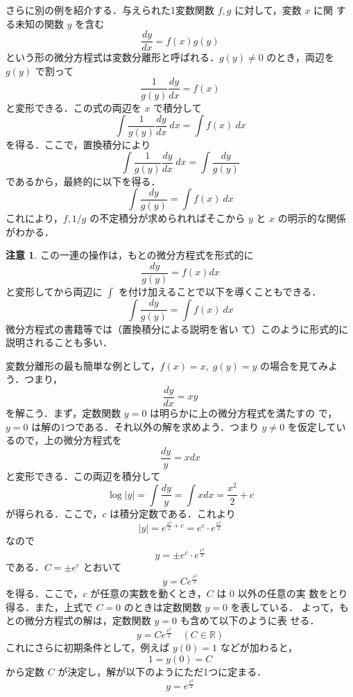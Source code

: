 \documentclass[10pt, uplatex, dvipdfmx]{jsarticle}
\theoremstyle{definition}
\newtheorem*{remark}{注意}
\numberwithin{equation}{section}
\newcommand{\ds}{\displaystyle}
\begin{document}

さらに別の例を紹介する．与えられた1変数関数 $f, g$ に対して，変数 $x$ に関
する未知の関数 $y$ を含む
\[
  \frac{dy}{dx} = f(x) g(y)
\]
という形の微分方程式は変数分離形と呼ばれる．$g(y) \neq 0$ のとき，両辺を $g(y)$ で割って
\[
  \frac{1}{g(y)}\frac{dy}{dx} = f(x)
\]
と変形できる．この式の両辺を $x$ で積分して
\[
  \int \frac{1}{g(y)} \frac{dy}{dx} \ dx = \int f(x) \ dx
\]
を得る．ここで，置換積分により
\[
  \int \frac{1}{g(y)} \frac{dy}{dx} \ dx = \int \frac{dy}{g(y)}
\]
であるから，最終的に以下を得る．
\[
  \int \frac{dy}{g(y)} = \int f(x) \ dx
\]
これにより，$f, 1/g$ の不定積分が求められればそこから $y$ と $x$ の明示的な関係がわかる．

\begin{remark}
  この一連の操作は，もとの微分方程式を形式的に
  \[
    \frac{dy}{g(y)} = f(x) dx
  \]
  と変形してから両辺に $\ds \int$ を付け加えることで以下を導くこともできる．
  \[
    \int \frac{dy}{g(y)} = \int f(x) \ dx
  \]
  微分方程式の書籍等では（置換積分による説明を省い
  て）このように形式的に説明されることも多い．\\
\end{remark}


変数分離形の最も簡単な例として，$f(x)=x, \; g(y)=y$ の場合を見てみよう．つまり，
\[
  \frac{dy}{dx} = x y
\]
を解こう．まず，定数関数 $y=0$ は明らかに上の微分方程式を満たすの
で，$y=0$ は解の1つである．それ以外の解を求めよう．つまり $y \neq 0$ を仮定しているので，上の微分方程式を
\[
  \frac{dy}{y} = x dx
\]
と変形できる．この両辺を積分して
\[
  \log |y| =  \int \frac{dy}{y} = \int x dx = \frac{x^2}{2} +c
\]
が得られる．ここで，$c$ は積分定数である．これより
\[
  |y| = e^{\frac{x^2}{2}+c} = e^{c} \cdot e^{\frac{x^2}{2}}
\]
なので
\[
  y = \pm e^{c} \cdot e^{\frac{x^2}{2}}
\]
である．$C= \pm e^{c}$ とおいて
\[
  y= C e^{\frac{x^2}{2}}
\]
を得る．ここで，$c$ が任意の実数を動くとき，$C$ は $0$ 以外の任意の実
数をとり得る．また，上式で $C=0$ のときは定数関数 $y=0$ を表している．
よって，もとの微分方程式の解は，定数関数 $y=0$ も含めて以下のように表
せる．
\[
  y = C e^{\frac{x^2}{2}} \quad (C \in \mathbb{R})
\]
これにさらに初期条件として，例えば $y(0) = 1$ などが加わると，
\[
  1=y(0) = C 
\]
から定数 $C$ が決定し，解が以下のようにただ1つに定まる．
\[
  y= e^{\frac{x^2}{2}}
\]


\newpage
\end{document}
